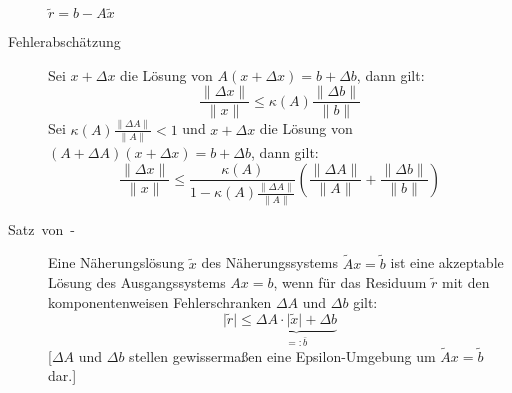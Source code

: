 \begin{description}
	$\tilde{r}=b-A\tilde{x}$
  \item [{Fehlerabschätzung}]
	Sei $x+\Delta x$ die Lösung von $A(x+\Delta x)=b+\Delta b$, dann gilt:
	\[ \frac{\lVert \Delta x \rVert}{\lVert x \rVert} \leq \kappa(A)\frac{\lVert \Delta b \rVert}{\lVert b \rVert} \]
	Sei $\kappa(A)\frac{\lVert \Delta A \rVert}{\lVert A \rVert} < 1$ und $x+\Delta x$ die Lösung von $(A+\Delta A)(x+\Delta x)=b+\Delta b$, dann gilt:
	\[
	  \frac{\lVert \Delta x \rVert}{\lVert x \rVert} \leq \frac{\kappa(A)}{1-\kappa(A)\frac{\lVert \Delta A \rVert}{\lVert A \rVert}}
	  \left( \frac{\lVert \Delta A \rVert}{\lVert A \rVert}+\frac{\lVert \Delta b \rVert}{\lVert b \rVert} \right)
	\]
  \item [{Satz~von~\noun{Prager}-\noun{Oettli}}]
	Eine Näherungslösung $\tilde{x}$ des Näherungssystems $\tilde{A}x=\tilde{b}$ ist eine akzeptable Lösung des Ausgangssystems $Ax=b$, wenn für das Residuum $\tilde{r}$ mit den komponentenweisen Fehlerschranken $\Delta A$ und $\Delta b$ gilt:
	\[ \lvert \tilde r \rvert \leq \underbrace{\Delta A \cdot \lvert \tilde x \rvert + \Delta b}_{=:\bar{b}} \]
	[$\Delta A$ und $\Delta b$ stellen gewissermaßen eine Epsilon-Umgebung um $\tilde{A}x=\tilde{b}$ dar.]
\end{description}

